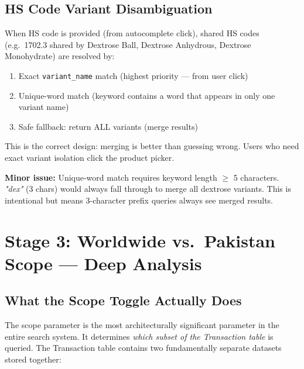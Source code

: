 \documentclass[12pt,a4paper]{article}
\begin{document}
\subsection{HS Code Variant Disambiguation}

When HS code is provided (from autocomplete click), shared HS codes (e.g.\ 1702.3 shared
by Dextrose Ball, Dextrose Anhydrous, Dextrose Monohydrate) are resolved by:

\begin{enumerate}
  \item Exact \texttt{variant\_name} match (highest priority --- from user click)
  \item Unique-word match (keyword contains a word that appears in only one variant name)
  \item Safe fallback: return ALL variants (merge results)
\end{enumerate}

\begin{okBox}
This is the correct design: merging is better than guessing wrong. Users who need
exact variant isolation click the product picker.
\end{okBox}

\begin{warnBox}
\textbf{Minor issue:} Unique-word match requires keyword length $\geq$ 5 characters.
\textit{"dex"} (3 chars) would always fall through to merge all dextrose variants.
This is intentional but means 3-character prefix queries always see merged results.
\end{warnBox}

\section{Stage 3: Worldwide vs.\ Pakistan Scope --- Deep Analysis}

\subsection{What the Scope Toggle Actually Does}

The scope parameter is the most architecturally significant parameter in the entire
search system. It determines \textit{which subset of the Transaction table} is queried.
The Transaction table contains two fundamentally separate datasets stored together:
\end{document}
